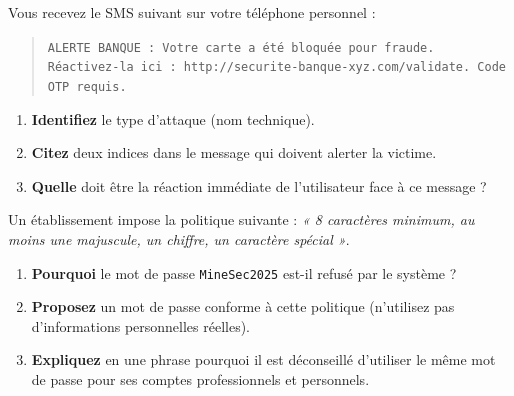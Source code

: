 \documentclass[11pt]{article}
\begin{document}
\begin{exercice}
Vous recevez le SMS suivant sur votre téléphone personnel : 
\begin{quote}
\texttt{ALERTE BANQUE : Votre carte a été bloquée pour fraude. Réactivez-la ici : http://securite-banque-xyz.com/validate. Code OTP requis.}
\end{quote}

\begin{enumerate}
    \item \textbf{Identifiez} le type d'attaque (nom technique).
    \item \textbf{Citez} deux indices dans le message qui doivent alerter la victime.
    \item \textbf{Quelle} doit être la réaction immédiate de l'utilisateur face à ce message ?
\end{enumerate}
\end{exercice}

\begin{exercice}
Un établissement impose la politique suivante : \textit{« 8 caractères minimum, au moins une majuscule, un chiffre, un caractère spécial »}.

\begin{enumerate}
    \item \textbf{Pourquoi} le mot de passe \texttt{MineSec2025} est-il refusé par le système ?
    \item \textbf{Proposez} un mot de passe conforme à cette politique (n'utilisez pas d'informations personnelles réelles).
    \item \textbf{Expliquez} en une phrase pourquoi il est déconseillé d'utiliser le même mot de passe pour ses comptes professionnels et personnels.
\end{enumerate}
\end{exercice}
\end{document}
